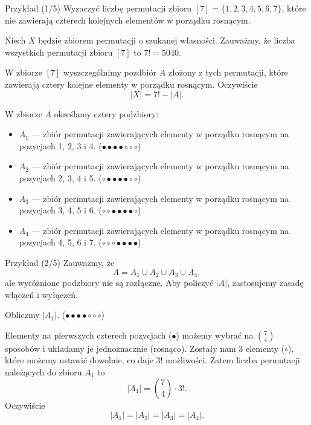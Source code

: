 \documentclass[a4paper,10pt]{beamer}
\begin{document}
\begin{frame}

\begin{exampleblock}{Przykład (1/5)}
Wyzaczyć liczbę permutacji zbioru $[7]=\{1,2,3,4,5,6,7\}$, które nie zawierają czterech kolejnych elementów w porządku rosnącym.

\bigskip

Niech $X$ będzie zbiorem permutacji o szukanej własności. Zauważmy, że liczba wszystkich permutacji zbioru $[7]$ to $7!=5040$.

W zbiorze $[7]$ wyszczególnimy pozdbiór $A$ złożony z tych permutacji, które zawierają cztery kolejne elementy w porządku rosnącym. Oczywiście $$|X|=7!-|A|.$$

W zbiorze $A$ określamy cztery podzbiory:
\begin{itemize}
\item $A_1$ --- zbiór permutacji zawierających elementy w porządku rosnącym na pozycjach 1, 2, 3 i 4. ($\bullet\bullet\bullet\bullet\circ\circ\circ$)
\item $A_2$ --- zbiór permutacji zawierających elementy w porządku rosnącym na pozycjach 2, 3, 4 i 5. ($\circ\bullet\bullet\bullet\bullet\circ\circ$)
\item $A_3$ --- zbiór permutacji zawierających elementy w porządku rosnącym na pozycjach 3, 4, 5 i 6. ($\circ\circ\bullet\bullet\bullet\bullet\circ$)
\item $A_4$ --- zbiór permutacji zawierających elementy w porządku rosnącym na pozycjach 4, 5, 6 i 7. ($\circ\circ\circ\bullet\bullet\bullet\bullet$)
\end{itemize}
\end{exampleblock}

\end{frame}



\begin{frame}

\begin{exampleblock}{Przykład (2/5)}
Zauważmy, że $$A=A_1\cup A_2\cup A_3\cup A_4,$$ ale wyróżnione podzbiory nie są rozłączne. Aby policzyć $|A|$, zastosujemy zasadę włączeń i wyłączeń.

\smallskip

Obliczmy $|A_1|$. ($\bullet\bullet\bullet\bullet\circ\circ\circ$)

Elementy na pierwszych czterech pozycjach ($\bullet$) możemy wybrać na ${7\choose4}$ sposobów i układamy je jednoznacznie (rosnąco). Zostały nam 3 elementy ($\circ$), które możemy ustawić dowolnie, co daje $3!$ możliwości. Zatem liczba permutacji należących do zbioru $A_1$ to $$|A_1|={7\choose4}\cdot3!.$$
Oczywiście $$|A_1|=|A_2|=|A_3|=|A_4|.$$
\end{exampleblock}

\end{frame}
\end{document}
